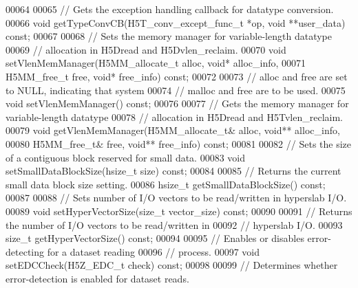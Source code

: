 \begin{DoxyCode}
00064 
00065         \textcolor{comment}{// Gets the exception handling callback for datatype conversion.}
00066         \textcolor{keywordtype}{void} getTypeConvCB(H5T\_conv\_except\_func\_t *op, \textcolor{keywordtype}{void} **user\_data) \textcolor{keyword}{const};
00067 
00068         \textcolor{comment}{// Sets the memory manager for variable-length datatype}
00069         \textcolor{comment}{// allocation in H5Dread and H5Dvlen\_reclaim.}
00070         \textcolor{keywordtype}{void} setVlenMemManager(H5MM\_allocate\_t alloc, \textcolor{keywordtype}{void}* alloc\_info,
00071                                H5MM\_free\_t free, \textcolor{keywordtype}{void}* free\_info) \textcolor{keyword}{const};
00072 
00073         \textcolor{comment}{// alloc and free are set to NULL, indicating that system}
00074         \textcolor{comment}{// malloc and free are to be used.}
00075         \textcolor{keywordtype}{void} setVlenMemManager() \textcolor{keyword}{const};
00076 
00077         \textcolor{comment}{// Gets the memory manager for variable-length datatype}
00078         \textcolor{comment}{// allocation in H5Dread and H5Tvlen\_reclaim.}
00079         \textcolor{keywordtype}{void} getVlenMemManager(H5MM\_allocate\_t& alloc, \textcolor{keywordtype}{void}** alloc\_info,
00080                                H5MM\_free\_t& free, \textcolor{keywordtype}{void}** free\_info) \textcolor{keyword}{const};
00081 
00082         \textcolor{comment}{// Sets the size of a contiguous block reserved for small data.}
00083         \textcolor{keywordtype}{void} setSmallDataBlockSize(hsize\_t size) \textcolor{keyword}{const};
00084 
00085         \textcolor{comment}{// Returns the current small data block size setting.}
00086         hsize\_t getSmallDataBlockSize() \textcolor{keyword}{const};
00087 
00088         \textcolor{comment}{// Sets number of I/O vectors to be read/written in hyperslab I/O.}
00089         \textcolor{keywordtype}{void} setHyperVectorSize(\textcolor{keywordtype}{size\_t} vector\_size) \textcolor{keyword}{const};
00090 
00091         \textcolor{comment}{// Returns the number of I/O vectors to be read/written in}
00092         \textcolor{comment}{// hyperslab I/O.}
00093         \textcolor{keywordtype}{size\_t} getHyperVectorSize() \textcolor{keyword}{const};
00094 
00095         \textcolor{comment}{// Enables or disables error-detecting for a dataset reading}
00096         \textcolor{comment}{// process.}
00097         \textcolor{keywordtype}{void} setEDCCheck(H5Z\_EDC\_t check) \textcolor{keyword}{const};
00098 
00099         \textcolor{comment}{// Determines whether error-detection is enabled for dataset reads.}

\end{DoxyCode}
